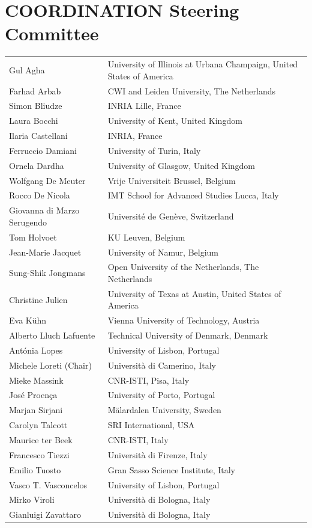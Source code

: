 \documentclass[]{llncs}
\begin{document}
\section*{COORDINATION Steering Committee}
\begin{longtable}{p{}p{}}
Gul Agha & University of Illinois at Urbana Champaign, United States of America\\
Farhad Arbab & CWI and Leiden University, The Netherlands\\
Simon Bliudze & INRIA Lille, France\\
Laura Bocchi & University of Kent, United Kingdom\\
Ilaria Castellani & INRIA, France\\
Ferruccio Damiani & University of Turin, Italy\\
Ornela Dardha & University of Glasgow, United Kingdom\\
Wolfgang De Meuter & Vrije Universiteit Brussel, Belgium\\
Rocco De Nicola & IMT School for Advanced Studies Lucca, Italy\\
Giovanna di Marzo Serugendo & Universit\'e de Gen\`eve, Switzerland\\
Tom Holvoet & KU Leuven, Belgium\\
Jean-Marie Jacquet & University of Namur, Belgium\\
Sung-Shik Jongmans & Open University of the Netherlands, The Netherlands\\
Christine Julien & University of Texas at Austin, United States of America\\
Eva K\"uhn & Vienna University of Technology, Austria\\
Alberto Lluch Lafuente & Technical University of Denmark, Denmark\\
Ant\'onia Lopes & University of Lisbon, Portugal\\
Michele Loreti (Chair) & Universit\`a di Camerino, Italy\\
Mieke Massink & CNR-ISTI, Pisa, Italy\\
Jos\'e Proen\c{c}a & University of Porto, Portugal\\
Marjan Sirjani & M\"alardalen University, Sweden\\
Carolyn Talcott & SRI International, USA\\
Maurice ter Beek & CNR-ISTI, Italy\\
Francesco Tiezzi & Universit\`a di Firenze, Italy\\
Emilio Tuosto & Gran Sasso Science Institute, Italy\\
Vasco T. Vasconcelos & University of Lisbon, Portugal\\
Mirko Viroli & Universit\`a di Bologna, Italy\\
Gianluigi Zavattaro & Universit\`a di Bologna, Italy
\end{longtable}
\end{document}
